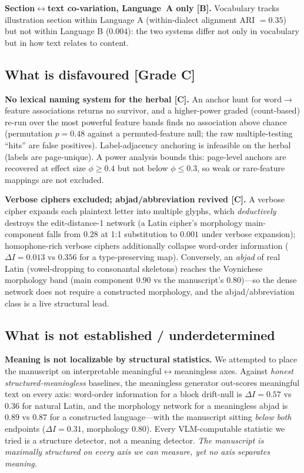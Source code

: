 \documentclass[11pt]{article}
\newcommand{\grade}[1]{{\small\textbf{[#1]}}}
\begin{document}
\textbf{Section$\leftrightarrow$text co-variation, Language~A only \grade{B}.}
Vocabulary tracks illustration section within Language A (within-dialect alignment ARI
$=0.35$) but not within Language B ($0.004$): the two systems differ not only in
vocabulary but in how text relates to content.

\subsection{What is disfavoured \grade{Grade C}}
\textbf{No lexical naming system for the herbal \grade{C}.} An anchor hunt for
word$\rightarrow$feature associations returns no survivor, and a higher-power graded
(count-based) re-run over the most powerful feature bands finds no association above
chance (permutation $p=0.48$ against a permuted-feature null; the raw multiple-testing
``hits'' are false positives). Label-adjacency anchoring is infeasible on the herbal
(labels are page-unique). A power analysis bounds this: page-level anchors are
recovered at effect size $\phi\geq 0.4$ but not below $\phi\leq 0.3$, so weak or
rare-feature mappings are not excluded.

\textbf{Verbose ciphers excluded; abjad/abbreviation revived \grade{C}.} A verbose
cipher expands each plaintext letter into multiple glyphs, which \emph{deductively}
destroys the edit-distance-1 network (a Latin cipher's morphology main-component falls
from $0.28$ at 1:1 substitution to $0.001$ under verbose expansion); homophone-rich
verbose ciphers additionally collapse word-order information ($\Delta I = 0.013$ vs
$0.356$ for a type-preserving map). Conversely, an \emph{abjad} of real Latin
(vowel-dropping to consonantal skeletons) reaches the Voynichese morphology band
(main component $0.90$ vs the manuscript's $0.80$)---so the dense network does not
require a constructed morphology, and the abjad/abbreviation class
\citep{hauer2016decoding} is a live structural lead.

\subsection{What is not established / underdetermined}
\textbf{Meaning is not localizable by structural statistics.} We attempted to place
the manuscript on interpretable meaningful$\leftrightarrow$meaningless axes. Against
\emph{honest structured-meaningless} baselines, the meaningless generator out-scores
meaningful text on every axis: word-order information for a block drift-null is
$\Delta I = 0.57$ vs $0.36$ for natural Latin, and the morphology network for a
meaningless abjad is $0.89$ vs $0.87$ for a constructed language---with the manuscript
sitting \emph{below both} endpoints ($\Delta I = 0.31$, morphology $0.80$). Every
VLM-computable statistic we tried is a structure detector, not a meaning detector.
\emph{The manuscript is maximally structured on every axis we can measure, yet no axis
separates meaning.}
\end{document}
